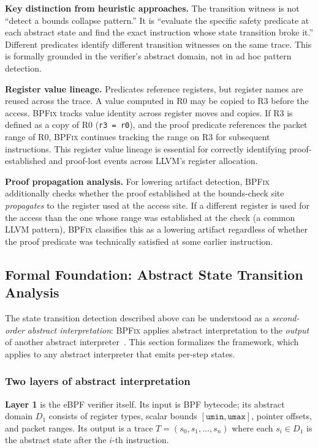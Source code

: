 \documentclass[sigplan,10pt,anonymous,review]{acmart}
\newcommand{\sys}{\textsc{BPFix}\xspace}
\begin{document}
\textbf{Key distinction from heuristic approaches.}  The transition witness is
not ``detect a bounds collapse pattern.''  It is ``evaluate the specific
safety predicate at each abstract state and find the exact instruction whose
state transition broke it.''  Different predicates identify different
transition witnesses on the same trace.  This is formally grounded in the
verifier's abstract domain, not in ad hoc pattern detection.

\textbf{Register value lineage.}  Predicates reference registers, but register
names are reused across the trace.  A value computed in R0 may be copied to R3
before the access.  \sys tracks value identity across register moves and
copies.  If R3 is defined as a copy of R0 (\texttt{r3 = r0}), and the
proof predicate references the packet range of R0, \sys continues
tracking the range on R3 for subsequent instructions.  This register value
lineage is essential for correctly identifying proof-established and proof-lost
events across LLVM's register allocation.

\textbf{Proof propagation analysis.}  For lowering artifact detection, \sys
additionally checks whether the proof established at the bounds-check site
\emph{propagates} to the register used at the access site.  If a different
register is used for the access than the one whose range was established at
the check (a common LLVM pattern), \sys classifies this as a lowering
artifact regardless of whether the proof predicate was technically satisfied
at some earlier instruction.

\subsection{Formal Foundation: Abstract State Transition Analysis}
\label{sec:formal-foundation}

The state transition detection described above can be understood as a
\emph{second-order abstract interpretation}: \sys applies abstract
interpretation to the \emph{output} of another abstract
interpreter~\cite{cousot1977}.  This section formalizes the framework,
which applies to any abstract interpreter that emits per-step states.

\subsubsection*{Two layers of abstract interpretation}

\textbf{Layer 1} is the eBPF verifier itself.  Its input is BPF
bytecode; its abstract domain $D_1$ consists of register types, scalar
bounds $[\texttt{umin},\texttt{umax}]$, pointer offsets, and packet ranges.
Its output is a trace $T = (s_0, s_1, \ldots, s_n)$ where each $s_i \in D_1$
is the abstract state after the $i$-th instruction.
\end{document}
